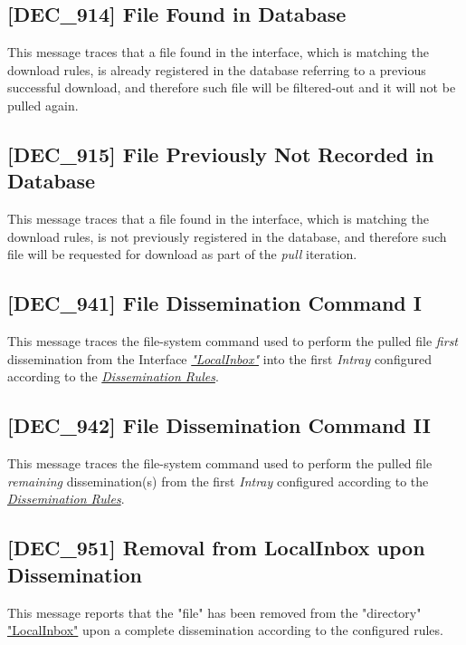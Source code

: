 \documentclass[dec_sum_main.tex]{subfiles}
\begin{document}
\label{DEC914}
\subsection{[DEC\_914] File Found in Database}
This message traces that a file found in the interface, which is matching the download rules, is already registered in the database referring to a previous successful download, and therefore such file will be filtered-out and it will not be pulled again.

\label{DEC915}
\subsection{[DEC\_915] File Previously Not Recorded in Database}
This message traces that a file found in the interface, which is matching the download rules, is not previously registered in the database, and therefore such file will be requested for download as part of the \textit{pull} iteration.

\subsection{[DEC\_941] File Dissemination Command I}
\label{DEC941}
This message traces the file-system command used to perform the pulled file \textit{first} dissemination from the Interface \hyperref[LocalInbox]{\textit{"LocalInbox"}} into the first \textit{Intray} configured according to the \hyperref[Dissemination rules]{\textit{Dissemination Rules}}.

\subsection{[DEC\_942] File Dissemination Command II}
\label{DEC942}
This message traces the file-system command used to perform the pulled file \textit{remaining} dissemination(s) from the first \textit{Intray} configured according to the \hyperref[Dissemination rules]{\textit{Dissemination Rules}}.

\subsection{[DEC\_951] Removal from LocalInbox upon Dissemination}
\label{DEC951}
This message reports that the "file" has been removed from the "directory" \hyperref[LocalInbox]{"LocalInbox"} upon a complete dissemination according to the configured rules.
\end{document}
